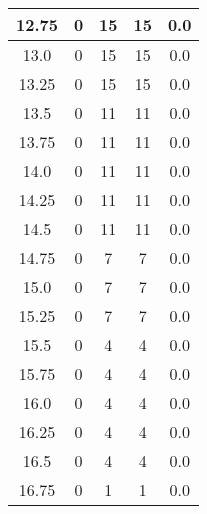 \documentclass[letterpaper, 12pt]{article}
\begin{document}
\begin{longtable}{|c|c|c|c|c|}
\hline
12.75 & 0 & 15 & 15 & 0.0 \\
\hline
13.0 & 0 & 15 & 15 & 0.0 \\
\hline
13.25 & 0 & 15 & 15 & 0.0 \\
\hline
13.5 & 0 & 11 & 11 & 0.0 \\
\hline
13.75 & 0 & 11 & 11 & 0.0 \\
\hline
14.0 & 0 & 11 & 11 & 0.0 \\
\hline
14.25 & 0 & 11 & 11 & 0.0 \\
\hline
14.5 & 0 & 11 & 11 & 0.0 \\
\hline
14.75 & 0 & 7 & 7 & 0.0 \\
\hline
15.0 & 0 & 7 & 7 & 0.0 \\
\hline
15.25 & 0 & 7 & 7 & 0.0 \\
\hline
15.5 & 0 & 4 & 4 & 0.0 \\
\hline
15.75 & 0 & 4 & 4 & 0.0 \\
\hline
16.0 & 0 & 4 & 4 & 0.0 \\
\hline
16.25 & 0 & 4 & 4 & 0.0 \\
\hline
16.5 & 0 & 4 & 4 & 0.0 \\
\hline
16.75 & 0 & 1 & 1 & 0.0 \\
\hline
\end{longtable}
\end{document}
